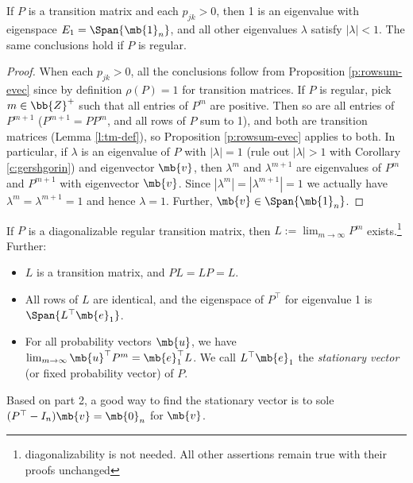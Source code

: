 \begin{corollary}\label{c:rowsum-evec}
If $P$ is a transition matrix and each $p_{jk}>0$, then 1 is an eigenvalue with eigenspace $E_1= \Span \{ \mb{1}_n \}$, and all other eigenvalues $\lambda$ satisfy $| \lambda|<1$. The same conclusions hold if $P$ is regular.
\end{corollary}
\begin{proof}%
When each $p_{jk}>0$, all the conclusions follow from Proposition \ref{p:rowsum-evec} since by definition $\rho(P)=1$ for transition matrices.
If $P$ is regular, pick $m \in \bb{Z}^+$ such that all entries of $P^m$ are positive.
Then so are all entries of $P^{m+1}$ ($P^{m+1}=PP^m$, and all rows of $P$ sum to 1), and both are transition matrices (Lemma \ref{l:tm-def}), so Proposition \ref{p:rowsum-evec} applies to both.
In particular, if $\lambda$ is an eigenvalue of $P$ with $| \lambda|=1$ (rule out $| \lambda|>1$ with Corollary \ref{c:gershgorin}) and eigenvector $\mb{v}$, then $\lambda^m$ and $\lambda^{m+1}$ are eigenvalues of $P^m$ and $P^{m+1}$ with eigenvector $\mb{v}$.
Since $| \lambda^m|=| \lambda^{m+1}|=1$ we actually have $\lambda^m= \lambda^{m+1}=1$ and hence $\lambda=1$. Further, $\mb{v}\in \Span \{ \mb{1}_n \}$.
\end{proof}
\begin{prop}
If $P$ is a diagonalizable regular transition matrix, then $L:= \lim_{m \to \infty}P^m$ exists.\footnote{diagonalizability is not needed. All other assertions remain true with their proofs unchanged} Further:
\begin{itemize}
\item $L$ is a transition matrix, and $PL=LP=L$.
\item All rows of $L$ are identical, and the eigenspace of $P^\top$ for eigenvalue 1 is $\Span \{ L^\top \mb{e}_1 \}$.
\item For all probability vectors $\mb{u}$, we have $\lim_{m \to \infty}\mb{u}^\top P^m= \mb{e}_1^\top L$. We call $L^\top \mb{e}_1$ the \emph{stationary vector} (or fixed probability vector) of $P$. 
\end{itemize}
\end{prop}
Based on part 2, a good way to find the stationary vector is to sole $(P^\top -I_n) \mb{v}= \mb{0}_n$ for $\mb{v}$.
